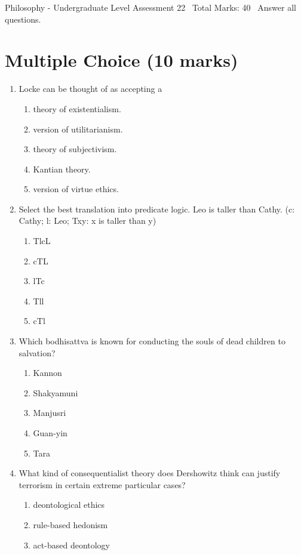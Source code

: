 \documentclass[12pt]{article}
\begin{document}
\begin{center}
Philosophy - Undergraduate Level Assessment 22 \
Total Marks: 40 \
Answer all questions.
\end{center}

\section*{Multiple Choice (10 marks)}
\begin{enumerate}[label=\arabic*.]
\item Locke can be thought of as accepting a
\begin{enumerate}[label=(\alph*)]
    \item theory of existentialism.
    \item version of utilitarianism.
    \item theory of subjectivism.
    \item Kantian theory.
    \item version of virtue ethics.
\end{enumerate}
\item Select the best translation into predicate logic. Leo is taller than Cathy. (c: Cathy; l: Leo; Txy: x is taller than y)
\begin{enumerate}[label=(\alph*)]
    \item TlcL
    \item cTL
    \item lTc
    \item Tll
    \item cTl
\end{enumerate}
\item Which bodhisattva is known for conducting the souls of dead children to salvation?
\begin{enumerate}[label=(\alph*)]
    \item Kannon
    \item Shakyamuni
    \item Manjusri
    \item Guan-yin
    \item Tara
\end{enumerate}
\item What kind of consequentialist theory does Dershowitz think can justify terrorism in certain extreme particular cases?
\begin{enumerate}[label=(\alph*)]
    \item deontological ethics
    \item rule-based hedonism
    \item act-based deontology

\end{enumerate}
\end{enumerate}
\end{document}
